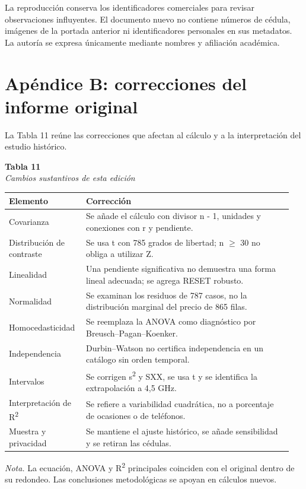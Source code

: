 \documentclass[12pt,letterpaper]{article}
\begin{document}
La reproducción conserva los identificadores comerciales para revisar observaciones influyentes. El documento nuevo no contiene números de cédula, imágenes de la portada anterior ni identificadores personales en sus metadatos. La autoría se expresa únicamente mediante nombres y afiliación académica.

\clearpage
\section*{Apéndice B: correcciones del informe original}
La Tabla 11 reúne las correcciones que afectan al cálculo y a la interpretación del estudio histórico.

\begin{center}\begin{minipage}{\linewidth}\textbf{Tabla 11}\\\textit{Cambios sustantivos de esta edición}\\\begin{singlespace}\small
\begin{tabular}{@{}p{0.2436\linewidth}p{0.7051\linewidth}@{}}\toprule
\textbf{Elemento} & \textbf{Corrección}\\\midrule
Covarianza & Se añade el cálculo con divisor n - 1, unidades y conexiones con r y pendiente.\\
Distribución de contraste & Se usa t con 785 grados de libertad; n $\geq$ 30 no obliga a utilizar Z.\\
Linealidad & Una pendiente significativa no demuestra una forma lineal adecuada; se agrega RESET robusto.\\
Normalidad & Se examinan los residuos de 787 casos, no la distribución marginal del precio de 865 filas.\\
Homocedasticidad & Se reemplaza la ANOVA como diagnóstico por Breusch–Pagan–Koenker.\\
Independencia & Durbin–Watson no certifica independencia en un catálogo sin orden temporal.\\
Intervalos & Se corrigen s\textsuperscript{2} y SXX, se usa t y se identifica la extrapolación a 4,5 GHz.\\
Interpretación de R\textsuperscript{2} & Se refiere a variabilidad cuadrática, no a porcentaje de ocasiones o de teléfonos.\\
Muestra y privacidad & Se mantiene el ajuste histórico, se añade sensibilidad y se retiran las cédulas.\\
\bottomrule\end{tabular}\end{singlespace}
\small\textit{Nota.} La ecuación, ANOVA y R\textsuperscript{2} principales coinciden con el original dentro de su redondeo. Las conclusiones metodológicas se apoyan en cálculos nuevos.
\end{minipage}\end{center}
\clearpage
\end{document}

